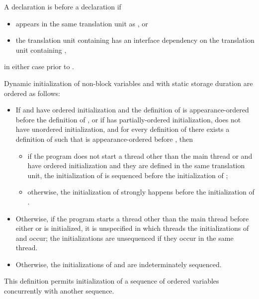 \pnum
A declaration  is
 before a declaration  if
\begin{itemize}
\item {} appears in the same translation unit as , or
\item the translation unit containing 
has an interface dependency on the translation unit containing ,
\end{itemize}
in either case prior to .

\pnum
Dynamic initialization of non-block variables  and 
with static storage duration are ordered as follows:
\begin{itemize}
\item
If  and  have ordered initialization and
the definition of 
is appearance-ordered before the definition of , or
if  has partially-ordered initialization,
 does not have unordered initialization, and
for every definition  of 
there exists a definition  of 
such that  is appearance-ordered before , then
\begin{itemize}
\item
if the program does not start a thread
other than the main thread
or  and  have ordered initialization and
they are defined in the same translation unit,
the initialization of 
is sequenced before
the initialization of ;
\item
otherwise,
the initialization of 
strongly happens before
the initialization of .
\end{itemize}

\item
Otherwise, if the program starts a thread
other than the main thread
before either  or  is initialized,
it is unspecified in which threads
the initializations of  and  occur;
the initializations are unsequenced if they occur in the same thread.

\item
Otherwise, the initializations of  and  are indeterminately sequenced.
\end{itemize}
\begin{note}
This definition permits initialization of a sequence of
ordered variables concurrently with another sequence.
\end{note}

